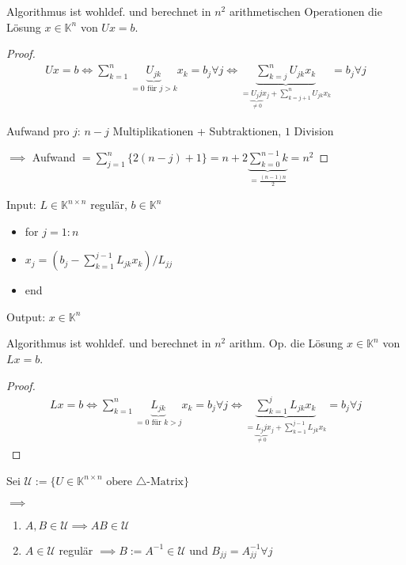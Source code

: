 \begin{lemma}
	Algorithmus ist wohldef. und berechnet in $n^2$ arithmetischen Operationen die Lösung $x \in \mathbb{K}^n$ von $Ux=b$.
\end{lemma}

\begin{proof}
	\begin{align*}
		Ux = b \iff \sum_{k=1}^{n} \underbrace{U_{jk}}_{=0 \text{ für } j>k} x_k = b_j \forall j \iff
		\underbrace{\sum_{k=j}^{n} U_{jk} x_k}_{=\underbrace{U_jj}_{\neq 0} x_j + \sum_{k=j+1}^{n} U_{jk} x_k} = b_j \forall j
	\end{align*}
	
	Aufwand pro $j$: $n-j$ Multiplikationen + Subtraktionen, $1$ Division
	
	$\implies$ Aufwand $= \sum_{j=1}^{n} \{2(n-j) + 1\} = n + 2\underbrace{\sum_{k=0}^{n-1}k}_{=\frac{(n-1)n}{2}} = n^2$
\end{proof}

\begin{algorithm}
	Input: $L \in \mathbb{K}^{n\times n}$ regulär, $b \in \mathbb{K}^n$
	\begin{itemize}
		\item for $j=1:n$
		\item \hspace{0.5cm} $x_j = \left(b_j - \sum_{k=1}^{j-1} L_{jk} x_k\right)/L_{jj}$
		\item end
	\end{itemize}
	Output: $x \in \mathbb{K}^n$
\end{algorithm}

\begin{lemma}
	Algorithmus ist wohldef. und berechnet in $n^2$ arithm. Op. die Lösung $x \in \mathbb{K}^n$ von $Lx=b$.
\end{lemma}

\begin{proof}
	\begin{align*}
		Lx = b \iff \sum_{k=1}^{n} \underbrace{L_{jk}}_{=0 \text{ für } k>j} x_k = b_j \forall j \iff
		\underbrace{\sum_{k=1}^{j} L_{jk} x_k}_{=\underbrace{L_jj}_{\neq 0} x_j + \sum_{k=1}^{j-1} L_{jk} x_k} = b_j \forall j
	\end{align*}
\end{proof}

\begin{lemma}
	Sei $\mathcal{U} := \{U \in \mathbb{K}^{n\times n} \text{ obere } \triangle\text{-Matrix}\}$
	
	$\implies$
	\begin{enumerate}
		\item $A, B \in \mathcal{U} \implies AB \in \mathcal{U}$
		\item $A \in \mathcal{U}$ regulär $\implies B:=A^{-1} \in \mathcal{U}$ und $B_{jj}=A_{jj}^{-1} \forall j$
	\end{enumerate}
\end{lemma}

